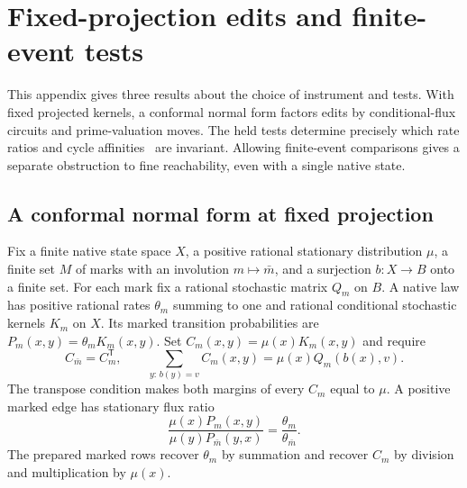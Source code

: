 \section{Fixed-projection edits and finite-event tests}\label{sec:companion}

This appendix gives three results about the choice of instrument and
tests. With fixed projected kernels, a conformal normal form factors
edits by conditional-flux circuits and prime-valuation moves. The
held tests determine precisely which rate ratios and cycle
affinities~\citep{schnakenberg} are invariant. Allowing finite-event comparisons gives a separate
obstruction to fine reachability, even with a single native state.

\subsection{A conformal normal form at fixed projection}

Fix a finite native state space \(X\), a positive rational stationary
distribution \(\mu\), a finite set \(M\) of marks with an involution
\(m\mapsto\bar m\), and a surjection \(b:X\to B\) onto a finite set.
For each mark fix a rational stochastic matrix \(Q_m\) on \(B\).
A native law has positive rational rates \(\theta_m\) summing to one
and rational conditional stochastic kernels \(K_m\) on \(X\). Its
marked transition probabilities are \(P_m(x,y)=\theta_m K_m(x,y)\). Set
\(C_m(x,y)=\mu(x)K_m(x,y)\) and require
\begin{equation}\label{eq:fixed-flux}
 C_{\bar m}=C_m^{\mathsf T},\qquad
 \sum_{y:\,b(y)=v}C_m(x,y)=\mu(x)Q_m(b(x),v).
\end{equation}
The transpose condition makes both margins of every \(C_m\) equal to
\(\mu\). A positive marked edge has stationary flux ratio
\begin{equation}\label{eq:fixed-flux-ratio}
 \frac{\mu(x)P_m(x,y)}{\mu(y)P_{\bar m}(y,x)}
 =\frac{\theta_m}{\theta_{\bar m}}.
\end{equation}
The prepared marked rows recover \(\theta_m\) by summation and recover
\(C_m\) by division and multiplication by \(\mu(x)\).

